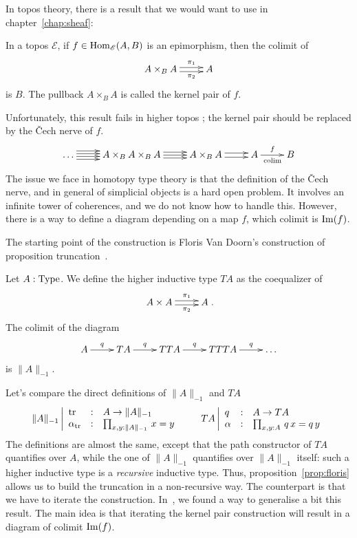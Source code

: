 In topos theory, there is a result that we would want to use in
chapter~\ref{chap:sheaf}:
\begin{lem}
  In a topos $\mathcal E$, if $f\in\mathrm{Hom}_{\mathcal E}(A,B)$ is an epimorphism, then the colimit
  of
  \[ \xymatrix{ A\times_B A \ar@<-.5ex>[r]_-{\pi_2}
      \ar@<.5ex>[r]^-{\pi_1} & A }\]
  is $B$. The pullback $A\times_B A$ is called the kernel pair of $f$.
  
\end{lem}
Unfortunately, this result fails in higher topos ; the kernel pair
should be replaced by the \v{C}ech nerve of $f$.
\[
  \xymatrix{
    \dots \ar@<-1ex>[r]\ar@<-.33ex>[r]\ar@<.33ex>[r]\ar@<1ex>[r] & A\times_B A\times_B A \ar@<-.7ex>[r] \ar[r] \ar@<.7ex>[r]
    & A\times_B A \ar@<-.5ex>[r] \ar@<.5ex>[r] & A \ar[r]^f_{\colim}& B
  }
\]
The issue we face in homotopy type theory is that the definition of
the \v{C}ech nerve, and in general of simplicial objects is a hard
open problem. It involves an infinite tower of coherences, and we
do not know how to handle this. However, there is a way to define a
diagram depending on a map $f$, which colimit is $\operatorname{Im}(f)$.

The starting point of the construction is Floris Van Doorn's
construction of proposition truncation~\cite{floris}. 

\begin{prop}\label{prop:floris}
  Let $A:\operatorname{Type}$. We define the higher inductive type $TA$ as the
  coequalizer of
  \[ \xymatrix{ A\times A \ar@<-.5ex>[r]_-{\pi_2}
      \ar@<.5ex>[r]^-{\pi_1} & A }.\]
  The colimit of the diagram
  \[ \xymatrix{
      A \ar[r]^-q& TA \ar[r]^-q& TTA \ar[r]^-q& TTTA \ar[r]^-q& \dots
    }\]
  is $\|A\|_{-1}$.
\end{prop}
Let's compare the direct definitions of $\|A\|_{-1}$ and $TA$
\[
  \|A\|_{-1} \left|
    \begin{array}{lll}
      \operatorname{tr} &:& A\to\|A\|_{-1} \\
      \alpha_{\operatorname{tr}} &:& \prod_{x,y:\|A\|_{-1}}\, x=y
    \end{array}
  \right.
  \qquad
  TA \left|
    \begin{array}{lll}
      q &:& A\to TA \\
      \alpha &:& \prod_{x,y:A}\, q\, x=q\, y
    \end{array}
  \right.
\]
The definitions are almost the same, except that the path constructor
of $TA$ quantifies over $A$, while the one of $\|A\|_{-1}$ quantifies
over $\|A\|_{-1}$ itself: such a higher inductive type is a {\em
  recursive} inductive type. Thus, proposition~\ref{prop:floris}
allows us to build the truncation in a non-recursive way. The
counterpart is that we have to iterate the
construction. In~\cite{boulier}, we found a way to generalise a bit
this result. The main idea is that iterating the kernel pair
construction will result in a diagram of colimit $\operatorname{Im}(f)$.

